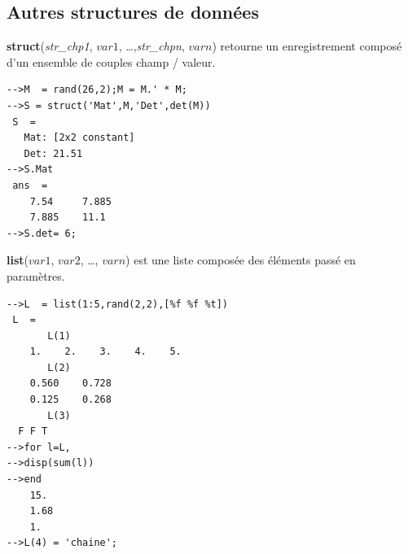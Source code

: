 \documentclass{article}
\begin{document}
\begin{multicols}{3}
\subsection*{Autres structures de données}
\begin{description}
\item {\textbf{struct}(\textit{str\_chp1}, $var1$, \ldots,\textit{str\_chpn}, $varn$)} retourne un enregistrement composé d'un ensemble de couples champ / valeur.\\
\begin{verbatim}
-->M  = rand(26,2);M = M.' * M;
-->S = struct('Mat',M,'Det',det(M))
 S  =
   Mat: [2x2 constant]
   Det: 21.51
-->S.Mat
 ans  =
    7.54     7.885  
    7.885    11.1
-->S.det= 6;
\end{verbatim}
\item{\textbf{list}($var1$, $var2$, \ldots, $varn$)} est une liste composée des éléments passé en paramètres.
\begin{verbatim}
-->L  = list(1:5,rand(2,2),[%f %f %t])
 L  =
       L(1)
    1.    2.    3.    4.    5.  
       L(2)
    0.560    0.728  
    0.125    0.268  
       L(3)
  F F T  
-->for l=L,
-->disp(sum(l))
-->end
    15.  
    1.68  
    1.  
-->L(4) = 'chaine';
\end{verbatim}
\end{description}

\end{multicols}
\end{document}
